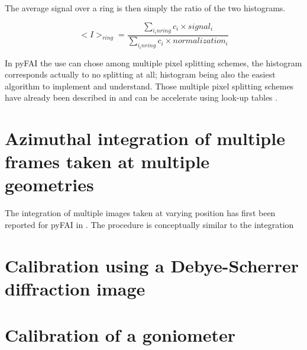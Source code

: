 \documentclass{iucr}              %
\begin{document}
The average signal over a ring is then simply the ratio of the two histograms.

$$
<I>_{ring} = \frac{\sum\limits_{i _in ring} c_i \times signal_i}
                  {\sum\limits_{i _in ring} c_i \times normalization_i} 
$$


In pyFAI the use can chose among multiple pixel splitting schemes, the histogram
corresponds actually to no splitting at all; histogram being also the easiest
algorithm to implement and understand. 
Those multiple pixel splitting schemes have already been described in \cite{}
and can be accelerate using look-up tables \cite{}.

\section{Azimuthal integration of multiple frames taken at multiple geometries}

The integration of multiple images taken at varying position has first been
reported for pyFAI in \cite{PyFAI_PDJ}. 
The procedure is conceptually similar to the integration    


\section{Calibration using a Debye-Scherrer diffraction image}


\section{Calibration of a goniometer}
\end{document}
